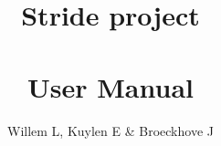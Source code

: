 \documentclass[a4paper,11pt]{report}
\title{Stride project \\ \\ User Manual}
\author{Willem L, Kuylen E \& Broeckhove J}
\begin{document}
\frontpages

\mainbodypages









\backpages
\end{document}
